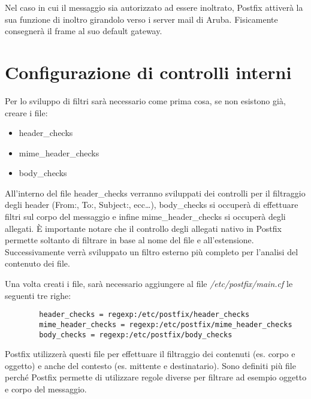     Nel caso in cui il messaggio sia autorizzato ad essere inoltrato, Postfix attiverà la sua funzione di inoltro 
    girandolo verso i server mail di Aruba. Fisicamente consegnerà il frame al suo default gateway.

    \pagebreak
    \section{Configurazione di controlli interni}
    Per lo sviluppo di filtri sarà necessario come prima cosa, se non esistono già, creare i file:

    \begin{itemize}
        \item header\_checks
        \item mime\_header\_checks
        \item body\_checks
    \end{itemize}

    All'interno del file header\_checks verranno sviluppati dei controlli per il filtraggio degli header
    (From:, To:, Subject:, ecc\dots), body\_checks si occuperà di effettuare filtri sul corpo del messaggio e
    infine mime\_header\_checks si occuperà degli allegati. È importante notare che il controllo degli allegati
    nativo in Postfix permette soltanto di filtrare in base al nome del file e all'estensione. Successivamente 
    verrà sviluppato un filtro esterno più completo per l'analisi del contenuto dei file.

    Una volta creati i file, sarà necessario aggiungere al file \textit{/etc/postfix/main.cf} le seguenti tre righe:

    \begin{verbatim}
        header_checks = regexp:/etc/postfix/header_checks
        mime_header_checks = regexp:/etc/postfix/mime_header_checks
        body_checks = regexp:/etc/postfix/body_checks
    \end{verbatim}

    Postfix utilizzerà questi file per effettuare il filtraggio dei contenuti (es. corpo e oggetto) e anche del
    contesto (es. mittente e destinatario). Sono definiti più file perché Postfix permette di utilizzare regole 
    diverse per filtrare ad esempio oggetto e corpo del messaggio.

